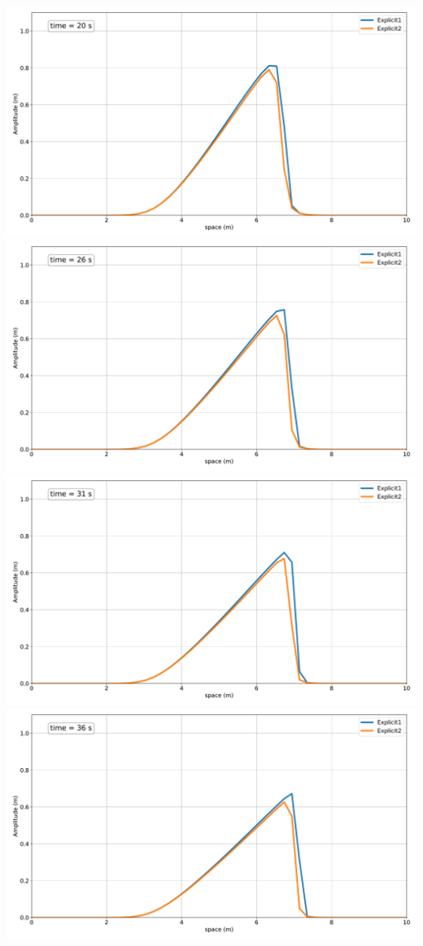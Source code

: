 \includegraphics[width=\linewidth]{../BurgersEquation/images/expl4.pdf}
\includegraphics[width=\linewidth]{../BurgersEquation/images/expl5.pdf}
\includegraphics[width=\linewidth]{../BurgersEquation/images/expl6.pdf}
\includegraphics[width=\linewidth]{../BurgersEquation/images/expl7.pdf}
